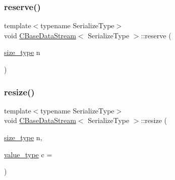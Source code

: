 \mbox{\label{class_c_base_data_stream_aeff66bbf5f2494240e3f8106540ff676}} 
\subsubsection{\texorpdfstring{reserve()}{reserve()}}
{\footnotesize\ttfamily template$<$typename Serialize\+Type$>$ \\
void \mbox{\hyperlink{class_c_base_data_stream}{C\+Base\+Data\+Stream}}$<$ Serialize\+Type $>$\+::reserve (\begin{DoxyParamCaption}\item[{\mbox{\hyperlink{class_c_base_data_stream_ad042ddea628c43357b9b13be89c71964}{size\+\_\+type}}}]{n }\end{DoxyParamCaption})\hspace{0.3cm}{\ttfamily [inline]}}

\mbox{\label{class_c_base_data_stream_a620febffdbbcabbd4a21fcd67e6d1154}} 
\subsubsection{\texorpdfstring{resize()}{resize()}}
{\footnotesize\ttfamily template$<$typename Serialize\+Type$>$ \\
void \mbox{\hyperlink{class_c_base_data_stream}{C\+Base\+Data\+Stream}}$<$ Serialize\+Type $>$\+::resize (\begin{DoxyParamCaption}\item[{\mbox{\hyperlink{class_c_base_data_stream_ad042ddea628c43357b9b13be89c71964}{size\+\_\+type}}}]{n,  }\item[{\mbox{\hyperlink{class_c_base_data_stream_a92957c776eb4c9a7668dd9cd82f7dbdd}{value\+\_\+type}}}]{c = {} }\end{DoxyParamCaption})\hspace{0.3cm}{\ttfamily [inline]}}

\mbox{\label{class_c_base_data_stream_ae93a5c7aa33f204030fd0a796a3b5f0f}} 
